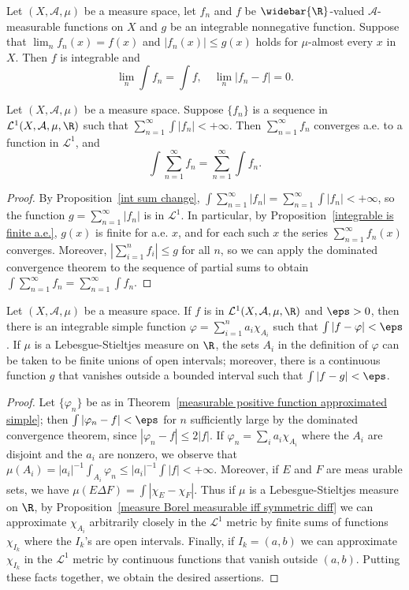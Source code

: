 \begin{corollary}
Let $(X,\mathcal{A},\mu)$ be a measure space, let $f_n$ and $f$ be $\widebar{\R}$-valued $\mathcal{A}$-measurable functions on $X$ and $g$ be an integrable nonnegative function. Suppose that $\lim_nf_n(x)=f(x)$ and $|f_n(x)|\leq g(x)$ holds for $\mu$-almost every $x$ in $X$. Then $f$ is integrable and
\[\lim_n\int f_n=\int f,\quad \lim_n|f_n-f|=0.\]
\end{corollary}
\begin{theorem}\label{integral absolutely convergent series}
Let $(X,\mathcal{A},\mu)$ be a measure space. Suppose $\{f_n\}$ is a sequence in $\mathcal{L}^1(X,\mathcal{A},\mu,\R)$ such that $\sum_{n=1}^{\infty}\int|f_n|<+\infty$. Then $\sum_{n=1}^{\infty}f_n$ converges a.e. to a function in $\mathcal{L}^1$, and 
\[\int\sum_{n=1}^{\infty}f_n=\sum_{n=1}^{\infty}\int f_n.\]
\end{theorem}
\begin{proof}
By Proposition~\ref{int sum change}, $\int\sum_{n=1}^{\infty}|f_n|=\sum_{n=1}^{\infty}\int|f_n|<+\infty$, so the function $g=\sum_{n=1}^{\infty}|f_n|$ is in $\mathcal{L}^1$. In particular, by Proposition~\ref{integrable is finite a.e.}, $g(x)$ is finite for a.e. $x$, and for each such $x$ the series $\sum_{n=1}^{\infty}f_n(x)$ converges. Moreover, $|\sum_{i=1}^{n}f_i|\leq g$ for all $n$, so we can apply the dominated convergence theorem to the sequence of partial sums to obtain $\int\sum_{n=1}^{\infty}f_n=\sum_{n=1}^{\infty}\int f_n$.
\end{proof}
\begin{theorem}\label{L^1 dense subset}
Let $(X,\mathcal{A},\mu)$ be a measure space. If $f$ is in $\mathcal{L}^1(X,\mathcal{A},\mu,\R)$ and $\eps>0$, then there is an integrable simple function $\varphi=\sum_{i=1}^{n}a_i\chi_{A_i}$ such that $\int|f-\varphi|<\eps$. If $\mu$ is a Lebesgue-Stieltjes measure on $\R$, the sets $A_i$ in the definition of $\varphi$ can be taken to be finite unions of open intervals; moreover, there is a continuous function $g$ that vanishes outside a bounded interval such that $\int|f-g|<\eps$.
\end{theorem}
\begin{proof}
Let $\{\varphi_n\}$ be as in Theorem~\ref{measurable positive function approximated simple}; then $\int|\varphi_n-f|<\eps$ for $n$ sufficiently large by the dominated convergence theorem, since $|\varphi_n-f|\leq 2|f|$. If $\varphi_n=\sum_{i}a_i\chi_{A_i}$ where the $A_i$ are disjoint and the $a_i$ are nonzero, we observe that $\mu(A_i)=|a_i|^{-1}\int_{A_i}\varphi_n\leq|a_i|^{-1}\int|f|<+\infty$. Moreover, if $E$ and $F$ are meas urable sets, we have $\mu(E\Delta F)=\int|\chi_E-\chi_F|$. Thus if $\mu$ is a Lebesgue-Stieltjes measure on $\R$, by Proposition~\ref{measure Borel measurable iff symmetric diff} we can approximate $\chi_{A_i}$ arbitrarily closely in the $\mathcal{L}^1$ metric by finite sums of functions $\chi_{I_k}$ where the $I_k$'s are open intervals. Finally, if $I_k=(a,b)$ we can approximate $\chi_{I_k}$ in the $\mathcal{L}^1$ metric by continuous functions that vanish outside $(a,b)$. Putting these facts together, we obtain the desired assertions.
\end{proof}
